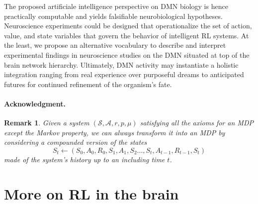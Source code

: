 \documentclass[10pt,letterpaper]{article}
\newtheorem{remark}{Remark}
\begin{document}
The proposed artificiale intelligence perspective
on DMN biology is hence practically computable and
yields falsifiable neurobiological hypotheses.
%
Neuroscience experiments could be designed that operationalize
the set of action, value, and state variables that govern
the behavior of intelligent RL systems.
%
At the least, we propose an alternative vocabulary to
describe and interpret experimental findings in neuroscience studies
on the DMN situated at top of the brain network hierarchy.
%
Ultimately,
DMN activity may instantiate a holistic integration
ranging from real experience over purposeful dreams to anticipated futures
for continued refinement of the organism's fate.



\paragraph{Acknowledgment.}


\small
% 
% 



\appendix

\begin{remark}
  Given a system $(\mathcal S, \mathcal A, r, p, \mu)$ satisfying all the axioms for an MDP
  except the Markov property, we can always transform it into an MDP by considering a compounded
  version of the states
  $$S_t \leftarrow (S_0,A_0,R_0,S_1,A_1,S_2\ldots,S_t,A_{t-1},R_{t-1},S_{t})$$ made of the system's
  history up to an including time $t$.
\end{remark}

\section{More on RL in the brain}
\end{document}
